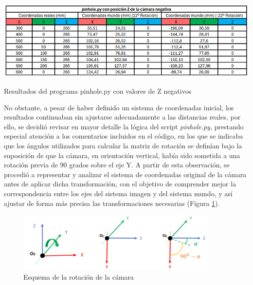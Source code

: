   
  \begin{table}[H]
   \centering
   \begin{center}
     \includegraphics[width=150mm]{figs/pinhole con Z negativa.png}
   \end{center}
   \caption{Resultados del programa pinhole.py con valores de Z negativos}
   \label{tab:pinhole_Zneg}
  \end{table}

No obstante, a pesar de haber definido un sistema de coordenadas inicial, los resultados continuaban sin ajustarse adecuadamente a las distancias reales, por ello, se decidió revisar en mayor detalle la lógica del script \textit{pinhole.py}, prestando especial atención a los comentarios incluidos en el código, en los que se indicaba que los ángulos utilizados para calcular la matriz de rotación se definían bajo la suposición de que la cámara, en orientación vertical, había sido sometida a una rotación previa de 90 grados sobre el eje Y. A partir de esta observación, se procedió a representar y analizar el sistema de coordenadas original de la cámara antes de aplicar dicha transformación, con el objetivo de comprender mejor la correspondencia entre los ejes del sistema imagen y del sistema mundo, y así ajustar de forma más precisa las transformaciones necesarias (Figura \ref{fig:esquema_rot_camara}). 

  \begin{figure}[H]
     \centering
     \begin{center}
       \includegraphics[width=100mm]{figs/Esquema rotación cámara.png}
     \end{center}
     \caption{Esquema de la rotación de la cámara}
    \label{fig:esquema_rot_camara}
  \end{figure}

